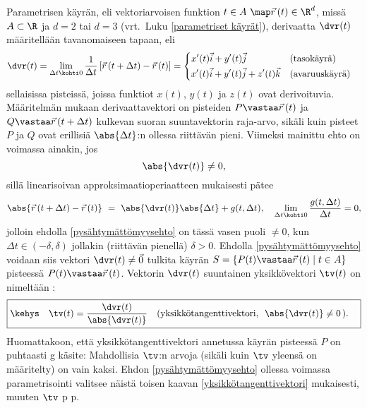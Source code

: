 Parametrisen käyrän, eli vektoriarvoisen funktion $t \in A\ \map \vec r\,(t) \in \R^d$, missä
$A \subset \R$ ja $d=2$ tai $d=3$ (vrt.\ Luku \ref{parametriset käyrät}), derivaatta $\dvr(t)$ 
määritellään tavanomaiseen tapaan, eli
\[ 
\dvr(t) = \lim_{\Delta t \kohti 0}\dfrac{1}{\Delta t}\left[\vec r\,(t+\Delta t)-\vec r\,(t)\right]
        = \begin{cases} \begin{aligned}
          x'(t)\vec i + y'(t)\vec j \quad\quad\quad\quad\ \ &\text{(tasokäyrä)} \\
          x'(t)\vec i + y'(t)\vec j + z'(t)\vec k \quad     &\text{(avaruuskäyrä)}
          \end{aligned} \end{cases} \]
sellaisissa pisteissä, joissa funktiot $x(t)$, $y(t)$ ja $z(t)$ ovat derivoituvia. Määritelmän
mukaan derivaattavektori on pisteiden $P \vastaa \vec r\,(t)$ ja
$Q \vastaa \vec r\,(t + \Delta t)$ kulkevan suoran suuntavektorin raja-arvo, sikäli kuin pisteet
$P$ ja $Q$ ovat erillisiä $\abs{\Delta t}$:n ollessa riittävän pieni. Viimeksi mainittu ehto on
voimassa ainakin, jos
\begin{equation} \label{pysähtymättömyysehto}
 \abs{\dvr(t)} \neq 0,
\end{equation}
sillä linearisoivan approksimaatioperiaatteen mukaisesti pätee
\[
\abs{\vec r\,(t+\Delta t)-\vec r\,(t)}\ =\ \abs{\dvr(t)}\abs{\Delta t}+g(t,\Delta t), \quad 
                                    \lim_{\Delta t \kohti 0} \frac{g(t,\Delta t)}{\Delta t}=0,
\]
jolloin ehdolla \eqref{pysähtymättömyysehto} on tässä vasen puoli $\neq 0$, kun
$\Delta t \in (-\delta,\delta)$ jollakin (riittävän pienellä) $\delta>0$. Ehdolla 
\eqref{pysähtymättömyysehto} voidaan siis vektori $\dvr(t) \neq \vec 0$ tulkita käyrän 
%
$S = \{P(t) \vastaa \vec r\,(t) \mid t \in A\}$  pisteessä 
$P(t) \vastaa \vec r\,(t)$. Vektorin $\dvr(t)$ suuntainen yksikkövektori $\tv(t)$ on nimeltään 
: %
\begin{equation} \label{yksikkötangenttivektori} 
\boxed{\kehys\quad \tv(t) = \dfrac{\dvr(t)}{\abs{\dvr(t)}} \quad 
                     (\text{yksikkötangenttivektori}, \,\ \abs{\dvr(t)} \neq 0\,). \quad} 
\end{equation}
Huomattakoon, että yksikkötangenttivektori annetussa käyrän pisteessä $P$ on puhtaasti
g käsite: Mahdollisia $\tv$:n arvoja (sikäli kuin $\tv$ yleensä on 
määritelty) on vain kaksi. Ehdon \eqref{pysähtymättömyysehto} ollessa voimassa parametrisointi 
valitsee näistä toisen kaavan \eqref{yksikkötangenttivektori} mukaisesti, muuten $\tv$ 
 p p. 

